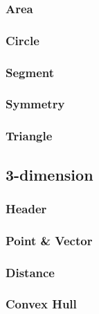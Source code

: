 \documentclass{article}
\begin{document}
\subsubsection{Area}


\subsubsection{Circle}


\subsubsection{Segment}


\subsubsection{Symmetry}


\subsubsection{Triangle}



\subsection{3-dimension}
\subsubsection{Header}


\subsubsection{Point \& Vector}


\subsubsection{Distance}


\subsubsection{Convex Hull}

\end{document}
